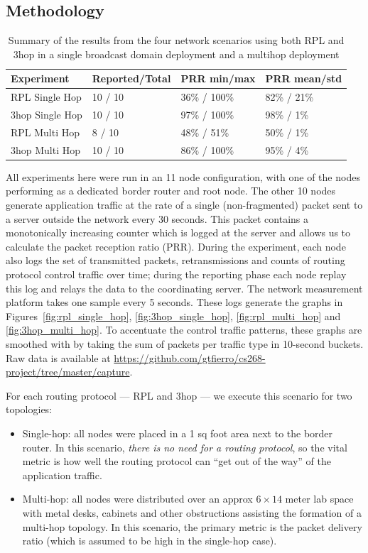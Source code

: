 \subsection{Methodology}

\begin{table}[t]
\centering
\caption{Summary of the results from the four network scenarios using both RPL and 3hop in a single broadcast domain deployment and a multihop deployment}
\label{table:results}
\begin{tabular}{|l|l|l|l|}
\hline
\textbf{Experiment} & \textbf{Reported/Total} & \textbf{PRR min/max} & \textbf{PRR mean/std} \\
\hline
\hline
RPL Single Hop & 10 / 10 & 36\% / 100\% & 82\% / 21\% \\
3hop Single Hop & 10 / 10 & 97\% / 100\% & 98\% / 1\% \\
RPL Multi Hop & 8 / 10 & 48\% / 51\% & 50\% / 1\% \\
3hop Multi Hop & 10 / 10 & 86\% / 100\% & 95\% / 4\% \\
\hline
\end{tabular}
\end{table}


All experiments here were run in an 11 node configuration, with one of the nodes performing as a dedicated border router and root node.
The other 10 nodes generate application traffic at the rate of a single (non-fragmented) packet sent to a server outside the network every 30 seconds.
This packet contains a monotonically increasing counter which is logged at the server and allows us to calculate the packet reception ratio (PRR).
During the experiment, each node also logs the set of transmitted packets, retransmissions and counts of routing protocol control traffic over time; during the reporting phase each node replay this log and relays the data to the coordinating server.
The network measurement platform takes one sample every 5 seconds.
These logs generate the graphs in Figures~\ref{fig:rpl_single_hop}, \ref{fig:3hop_single_hop}, \ref{fig:rpl_multi_hop} and \ref{fig:3hop_multi_hop}.
To accentuate the control traffic patterns, these graphs are smoothed with by taking the sum of packets per traffic type in 10-second buckets. Raw data is available at \url{https://github.com/gtfierro/cs268-project/tree/master/capture}.

For each routing protocol --- RPL and 3hop --- we execute this scenario for two topologies:
\begin{itemize}
\item Single-hop: all nodes were placed in a 1 sq foot area next to the border router.
In this scenario, \emph{there is no need for a routing protocol}, so the vital metric is how well the routing protocol can ``get out of the way'' of the application traffic.
\item Multi-hop: all nodes were distributed over an approx $6\times 14$ meter lab space with metal desks, cabinets and other obstructions assisting the formation of a multi-hop topology.
In this scenario, the primary metric is the packet delivery ratio (which is assumed to be high in the single-hop case).
\end{itemize}

